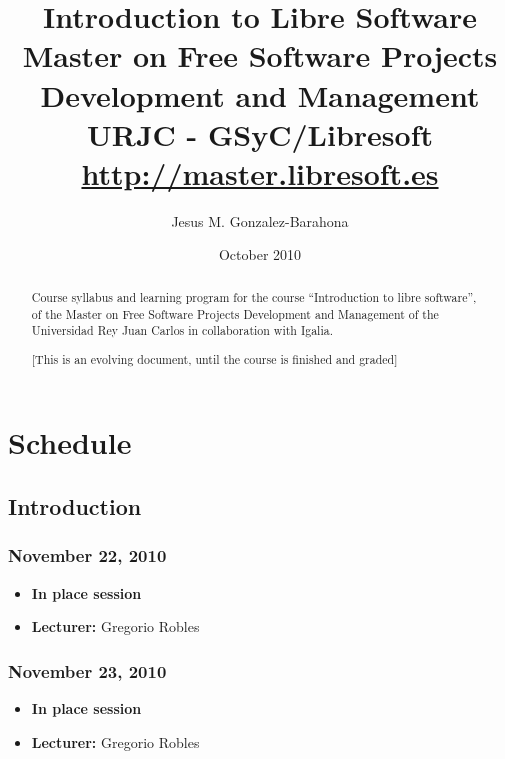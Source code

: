\documentclass[a4paper]{article}
\title{Introduction to Libre Software\\
Master on Free Software Projects Development and Management \\
URJC - GSyC/Libresoft \\
\url{http://master.libresoft.es}}
\author{Jesus M. Gonzalez-Barahona}
\date{October 2010}
\begin{document}
\maketitle

\begin{abstract}
Course syllabus and learning program for the course ``Introduction to libre software'', of the Master on Free Software Projects Development and Management of the Universidad Rey Juan Carlos in collaboration with Igalia.

[This is an evolving document, until the course is finished and graded]
\end{abstract}

\tableofcontents

\section{Schedule}

\subsection{Introduction}

\subsubsection{November 22, 2010}

\begin{itemize}
\item \textbf{In place session}
\item \textbf{Lecturer:} Gregorio Robles
\end{itemize}

\subsubsection{November 23, 2010}

\begin{itemize}
\item \textbf{In place session}
\item \textbf{Lecturer:} Gregorio Robles
\end{itemize}
\end{document}

